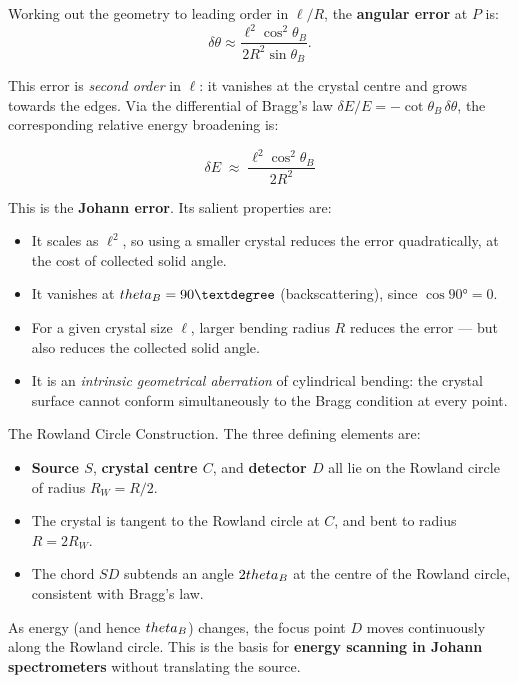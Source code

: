 Working out the geometry to leading order in $\ell/R$, the \textbf{angular error} at $P$ is:
\begin{equation}
  \delta\theta \approx \frac{\ell^2 \cos^2\theta_B}{2R^2\sin\theta_B}.
  \label{eq:angular_error}
\end{equation}

This error is \emph{second order} in $\ell$: it vanishes at the crystal centre and grows
towards the edges.  Via the differential of Bragg's law
$\delta E / E = -\cot\theta_B\,\delta\theta$, the corresponding relative energy broadening
is:

\begin{equation}
  \delta E \;\approx\; \frac{\ell^2\cos^2\theta_B}{2R^2}
  \label{eq:johann_error}
\end{equation}

This is the \textbf{Johann error}.  Its salient properties are:
\begin{itemize}
  \item It scales as $\ell^2$, so using a smaller crystal reduces the error quadratically,
        at the cost of collected solid angle.
  \item It vanishes at $\\theta_B = 90°$ (backscattering), since $\cos 90° = 0$.
  \item For a given crystal size $\ell$, larger bending radius $R$ reduces the error ---
        but also reduces the collected solid angle.
  \item It is an \emph{intrinsic geometrical aberration} of cylindrical bending: the
        crystal surface cannot conform simultaneously to the Bragg condition at every point.
\end{itemize}

The Rowland Circle Construction.
The three defining elements are:
\begin{itemize}
  \item \textbf{Source $S$}, \textbf{crystal centre $C$}, and \textbf{detector $D$} all
        lie on the Rowland circle of radius $R_W = R/2$.
  \item The crystal is tangent to the Rowland circle at $C$, and bent to radius
        $R = 2R_W$.
  \item The chord $SD$ subtends an angle $2\\theta_B$ at the centre of the Rowland circle,
        consistent with Bragg's law.
\end{itemize}

As energy (and hence $\\theta_B$) changes, the focus point $D$ moves continuously along the
Rowland circle.  This is the basis for \textbf{energy scanning in Johann spectrometers}
without translating the source.


